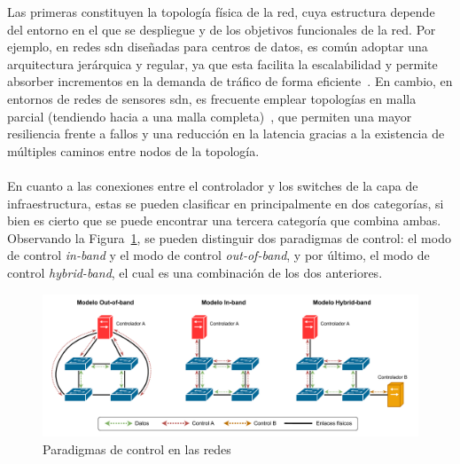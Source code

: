 Las primeras constituyen la topología física de la red, cuya estructura depende del entorno en el que se despliegue y de los objetivos funcionales de la red. Por ejemplo, en redes \gls{sdn} diseñadas para centros de datos, es común adoptar una arquitectura jerárquica y regular, ya que esta facilita la escalabilidad y permite absorber incrementos en la demanda de tráfico de forma eficiente~\cite{lopez2021nuevos}. En cambio, en entornos de redes de sensores \gls{sdn}, es frecuente emplear topologías en malla parcial (tendiendo hacia a una malla completa)~\cite{baddeley2018evolving}, que permiten una mayor resiliencia frente a fallos y una reducción en la latencia gracias a la existencia de múltiples caminos entre nodos de la topología.\\
\\
En cuanto a las conexiones entre el controlador y los switches de la capa de infraestructura, estas se pueden clasificar en principalmente en dos categorías, si bien es cierto que se puede encontrar una tercera categoría que combina ambas. Observando la Figura~\ref{fig:sdn_control_paradigms}, se pueden distinguir dos paradigmas de control: el modo de control \textit{in-band} y el modo de control \textit{out-of-band}, y por último, el modo de control \textit{hybrid-band}, el cual es una combinación de los dos anteriores. \\

\begin{figure}[ht!]
\centering
\includegraphics[width=\textwidth]{fig/02_sota/sota_5_sdn_control_paradigms.drawio.pdf}
\caption{Paradigmas de control en las redes }
\label{fig:sdn_control_paradigms}
\end{figure}


